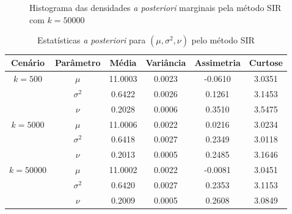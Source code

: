 \documentclass[9pt]{beamer}
\begin{document}
\begin{frame}
\begin{figure}[t]
\caption{Histograma das densidades \textit{a posteriori} marginais pela método SIR com $k = 50000$}%
\end{figure}
\end{frame}
\begin{frame}
\begin{table}[htb]
\caption{Estatísticas \textit{a posteriori} para $(\mu, \sigma^2, \nu)$ pelo método SIR}
\label{tab2}
\centering
\begin{tabular}{cccccc}
\toprule
Cenário & Parâmetro & Média & Variância & Assimetria & Curtose \\
\midrule
$k = 500$ & $\mu$      & 11.0003 & 0.0023 & -0.0610 & 3.0351 \\
& $\sigma^2$ &  0.6422 & 0.0026 &  0.1261 & 3.1453 \\
& $\nu$      &  0.2028 & 0.0006 &  0.3510 & 3.5475 \\
\midrule
$k = 5000$ & $\mu$      & 11.0006 & 0.0022 &  0.0216 & 3.0234 \\
& $\sigma^2$ &  0.6418 & 0.0027 &  0.2349 & 3.0118 \\
& $\nu$      &  0.2013 & 0.0005 &  0.2485 & 3.1646 \\
\midrule
$k = 50000$ & $\mu$      & 11.0002 & 0.0022 & -0.0081 & 3.0451 \\
& $\sigma^2$ &  0.6420 & 0.0027 &  0.2353 & 3.1153 \\
& $\nu$      &  0.2009 & 0.0005 &  0.2608 & 3.0849 \\
\bottomrule
\end{tabular}
\end{table}
\end{frame}
\end{document}
